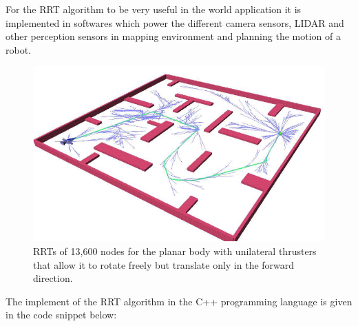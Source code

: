 For the RRT algorithm to be very useful in the world application it is implemented in softwares which power the different camera sensors, LIDAR and other perception sensors in mapping environment and planning the motion of a robot.

\begin{figure}[h]
    \centering
    \includegraphics[scale=0.5]{images/rrt1.png}
    \caption[RRTs of 13,600 nodes for the planar body with unilateral thrusters that allow it to rotate freely but translate only in the forward direction]{RRTs of 13,600 nodes for the planar body with unilateral thrusters that allow it to rotate freely but translate only in the forward direction. \cite{lavalle2001randomized}}
\end{figure}

The implement of the RRT algorithm in the C++ programming language is given in the code snippet below:



